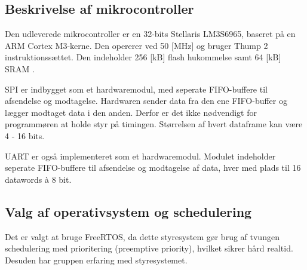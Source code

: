 \subsection{Beskrivelse af mikrocontroller}
Den udleverede mikrocontroller er en 32-bits Stellaris LM3S6965, 
baseret på en ARM Cortex M3-kerne. 
Den opererer ved 50 [MHz] og bruger Thump 2 instruktionssættet. 
Den indeholder 256 [kB] flash hukommelse samt 64 [kB] SRAM \citep{lm3s6965}.

SPI er indbygget som et hardwaremodul, 
med seperate FIFO-buffere til afsendelse og modtagelse. 
Hardwaren sender data fra den ene FIFO-buffer og 
lægger modtaget data i den anden. 
Derfor er det ikke nødvendigt for programmøren at holde styr på timingen. 
Størrelsen af hvert dataframe kan være 4 - 16 bits. 

UART er også implementeret som et hardwaremodul. 
Modulet indeholder seperate FIFO-buffere til afsendelse og modtagelse af data, hver med plads til 16 datawords à 8 bit. 

\subsection{Valg af operativsystem og schedulering}
Det er valgt at bruge FreeRTOS, da dette styresystem gør brug af tvungen schedulering med prioritering (preemptive priority), hvilket sikrer hård realtid.
Desuden har gruppen erfaring med styresystemet.




